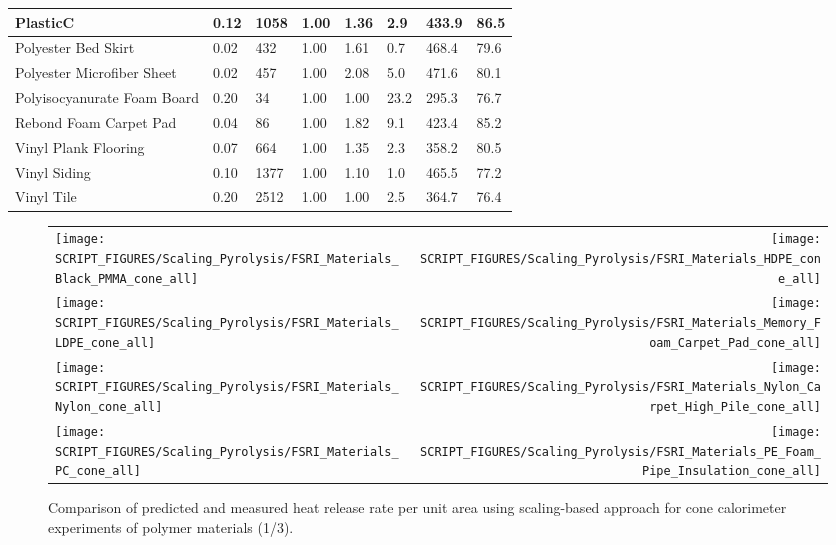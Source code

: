 \begin{table}[!h]
\begin{tabular}{|p{5.5cm}|p{1.0cm}|p{1.0cm}|p{0.8cm}|p{1.4cm}|p{1.0cm}|p{1.0cm}|p{1.2cm}|}
PlasticC & 0.12 & 1058 & 1.00 & 1.36 & 2.9 & 433.9 & 86.5 \\ \hline 
Polyester Bed Skirt & 0.02 & 432 & 1.00 & 1.61 & 0.7 & 468.4 & 79.6 \\ \hline 
Polyester Microfiber Sheet & 0.02 & 457 & 1.00 & 2.08 & 5.0 & 471.6 & 80.1 \\ \hline 
Polyisocyanurate Foam Board & 0.20 & 34 & 1.00 & 1.00 & 23.2 & 295.3 & 76.7 \\ \hline 
Rebond Foam Carpet Pad & 0.04 & 86 & 1.00 & 1.82 & 9.1 & 423.4 & 85.2 \\ \hline 
Vinyl Plank Flooring & 0.07 & 664 & 1.00 & 1.35 & 2.3 & 358.2 & 80.5 \\ \hline 
Vinyl Siding & 0.10 & 1377 & 1.00 & 1.10 & 1.0 & 465.5 & 77.2 \\ \hline 
Vinyl Tile & 0.20 & 2512 & 1.00 & 1.00 & 2.5 & 364.7 & 76.4 \\ \hline 
\end{tabular}
\label{Properties_FSRI_NIJ_Materials_polymers}
\end{table}

\begin{figure}[p]
\begin{tabular*}{\textwidth}{l@{\extracolsep{\fill}}r}
\texttt{[image: SCRIPT\_FIGURES/Scaling\_Pyrolysis/FSRI\_Materials\_Black\_PMMA\_cone\_all]} &
\texttt{[image: SCRIPT\_FIGURES/Scaling\_Pyrolysis/FSRI\_Materials\_HDPE\_cone\_all]} \\
\texttt{[image: SCRIPT\_FIGURES/Scaling\_Pyrolysis/FSRI\_Materials\_LDPE\_cone\_all]} &
\texttt{[image: SCRIPT\_FIGURES/Scaling\_Pyrolysis/FSRI\_Materials\_Memory\_Foam\_Carpet\_Pad\_cone\_all]} \\
\texttt{[image: SCRIPT\_FIGURES/Scaling\_Pyrolysis/FSRI\_Materials\_Nylon\_cone\_all]} &
\texttt{[image: SCRIPT\_FIGURES/Scaling\_Pyrolysis/FSRI\_Materials\_Nylon\_Carpet\_High\_Pile\_cone\_all]} \\
\texttt{[image: SCRIPT\_FIGURES/Scaling\_Pyrolysis/FSRI\_Materials\_PC\_cone\_all]} &
\texttt{[image: SCRIPT\_FIGURES/Scaling\_Pyrolysis/FSRI\_Materials\_PE\_Foam\_Pipe\_Insulation\_cone\_all]} \\
\end{tabular*}
\caption[Heat release rate per unit area of FSRI materials using scaling model, polymer materials]
{Comparison of predicted and measured heat release rate per unit area using scaling-based approach for cone calorimeter experiments of polymer materials (1/3).}
\label{FSRI_Materials_polymers1}
\end{figure}

